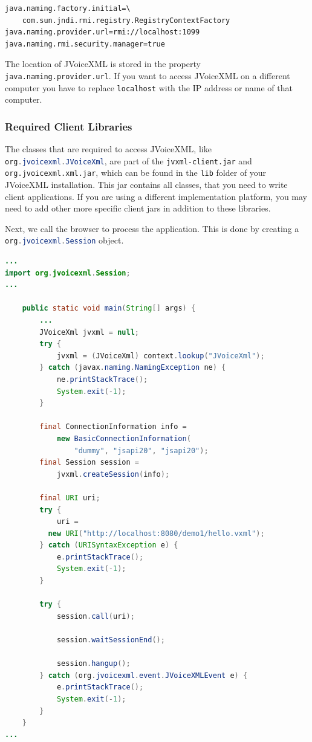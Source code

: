 \documentclass[11pt,a4paper]{book}
\begin{document}
\begin{lstlisting}
java.naming.factory.initial=\
    com.sun.jndi.rmi.registry.RegistryContextFactory
java.naming.provider.url=rmi://localhost:1099
java.naming.rmi.security.manager=true
\end{lstlisting}

The location of JVoiceXML is stored in the property 
\texttt{java.naming.pro\-vider.url}. If you want to access JVoiceXML on a 
different computer you have to replace \texttt{localhost} with the IP address 
or name of that computer.

\subsubsection{Required Client Libraries}

The classes  that are required to access JVoiceXML, like
\lstinline[language=Java]{org.jvoicexml.JVoiceXml}, are part of the \texttt{jvxml-client.jar} and
\texttt{org.jvoicexml.xml.jar}, which can be found in the \texttt{lib} folder of
your JVoiceXML installation. This jar contains all classes, that you need to write
client applications. If you are using a different implementation platform, you
may need to add other more specific client jars in addition to these libraries.

Next, we call the browser to process the application. This is done
by creating a \lstinline[language=Java]{org.jvoicexml.Session} object.

\begin{lstlisting}[language=Java]
...
import org.jvoicexml.Session;
...

    public static void main(String[] args) {
        ...
        JVoiceXml jvxml = null;
        try {
            jvxml = (JVoiceXml) context.lookup("JVoiceXml");
        } catch (javax.naming.NamingException ne) {
            ne.printStackTrace();
            System.exit(-1);
        }

        final ConnectionInformation info =
            new BasicConnectionInformation(
                "dummy", "jsapi20", "jsapi20");
        final Session session = 
            jvxml.createSession(info);

        final URI uri;
        try {
            uri = 
          new URI("http://localhost:8080/demo1/hello.vxml");
        } catch (URISyntaxException e) {
            e.printStackTrace();
            System.exit(-1);
        }

        try {
            session.call(uri);

            session.waitSessionEnd();

            session.hangup();
        } catch (org.jvoicexml.event.JVoiceXMLEvent e) {
            e.printStackTrace();
            System.exit(-1);
        }
    }
...
\end{lstlisting}
\end{document}
